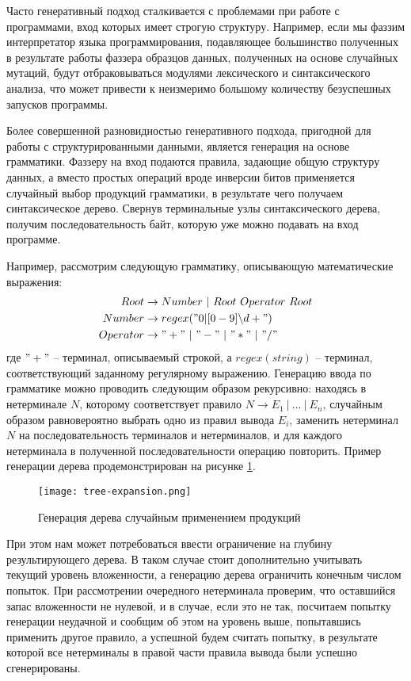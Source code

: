 Часто генеративный подход сталкивается с проблемами при работе с программами, вход которых имеет строгую структуру. Например, если мы фаззим интерпретатор языка программирования, подавляющее большинство полученных в результате работы фаззера образцов данных, полученных на основе случайных мутаций, будут отбраковываться модулями лексического и синтаксического анализа, что может привести к неизмеримо большому количеству безуспешных запусков программы. 

Более совершенной разновидностью генеративного подхода, пригодной для работы с структурированными данными, является генерация на основе грамматики. Фаззеру на вход подаются правила, задающие общую структуру данных, а вместо простых операций вроде инверсии битов применяется случайный выбор продукций грамматики, в результате чего получаем синтаксическое дерево. Свернув терминальные узлы синтаксического дерева, получим последовательность байт, которую уже можно подавать на вход программе.

Например, рассмотрим следующую грамматику, описывающую математические выражения:
\begin{align*} %
	Root &\rightarrow Number \ | \ Root \ Operator \ Root \\
	Number &\rightarrow regex("0|[0-9]\backslash d+") \\
	Operator &\rightarrow "+" \ | \ "-" \ | \ "*" \ | \ "/"	
\end{align*}
где $"+"$ -- терминал, описываемый строкой, а $regex(string)$ -- терминал, соответствующий заданному регулярному выражению. Генерацию ввода по грамматике можно проводить следующим образом рекурсивно: находясь в нетерминале $N$, которому соответствует правило $N \rightarrow E_1 \ | \ ...\  | \ E_n$, случайным образом равновероятно выбрать одно из правил вывода $E_i$, заменить нетерминал $N$ на последовательность терминалов и нетерминалов, и для каждого нетерминала в полученной последовательности операцию повторить. Пример генерации дерева продемонстрирован на рисунке \ref{fig:tree_expansion}.

\begin{figure}[h]
	\centering
	\texttt{[image: tree-expansion.png]}
	\caption{Генерация дерева случайным применением продукций}
	\label{fig:tree_expansion}
\end{figure}%

При этом нам может потребоваться ввести ограничение на глубину результирующего дерева. В таком случае стоит дополнительно учитывать текущий уровень вложенности, а генерацию дерева ограничить конечным числом попыток. При рассмотрении очередного нетерминала проверим, что оставшийся запас вложенности не нулевой, и в случае, если это не так, посчитаем попытку генерации неудачной и сообщим об этом на уровень выше, попытавшись применить другое правило, а успешной будем считать попытку, в результате которой все нетерминалы в правой части правила вывода были успешно сгенерированы.

